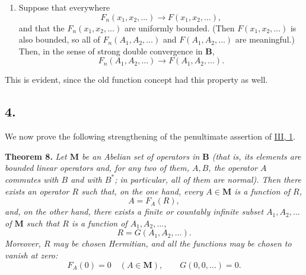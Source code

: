\documentclass[12pt,b5paper,twoside]{article}
\begin{document}
\begin{enumerate}[label=\alph*),start=6]
\item Suppose that everywhere
\[
 F_n(x_1,x_2,\ldots)\longrightarrow F(x_1,x_2,\ldots),
\]
and that the $F_n(x_1,x_2,\ldots)$ are uniformly bounded.  (Then
$F(x_1,x_2,\ldots)$ is also bounded, so all of
$F_n(A_1,A_2,\ldots)$ and $F(A_1,A_2,\ldots)$ are meaningful.)  Then, in the sense
of strong double convergence in $\mathbf B$,
\[
 F_n(A_1,A_2,\ldots)\longrightarrow F(A_1,A_2,\ldots).
\]
\end{enumerate}
This is evident, since the old function concept had this property as well.

\subsection*{4.}
\label{sec:IV.4}
We now prove the following strengthening of the penultimate assertion of
\hyperref[sec:III.1]{III, 1}.

\medskip
{}\label{thm:8}
\noindent\textbf{Theorem 8.}
\textit{Let $\mathbf M$ be an Abelian set of operators in $\mathbf B$ (that is,
its elements are bounded linear operators and, for any two of them, $A,B$, the
operator $A$ commutes with $B$ and with $B^*$; in particular, all of them are normal).
Then there exists an operator $R$ such that, on the one hand, every $A\in \mathbf M$
is a function of $R$,}
\[
 A=F_A(R),
\]
\textit{and, on the other hand, there exists a finite or countably infinite subset
$A_1,A_2,\ldots$ of $\mathbf M$ such that $R$ is a function of
$A_1,A_2,\ldots$,}
\[
 R=G(A_1,A_2,\ldots).
\]
\textit{Moreover, $R$ may be chosen Hermitian, and all the functions may be chosen to
vanish at zero:}
\[
 F_A(0)=0\quad(A\in \mathbf M),
 \qquad G(0,0,\ldots)=0.
\]
\end{document}

